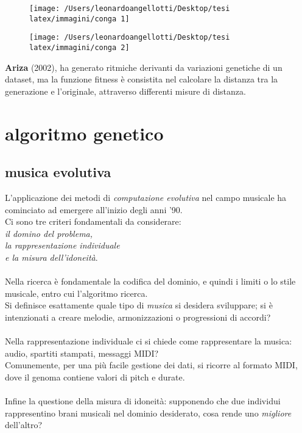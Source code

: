 \documentclass[a4paper,12pt]{report}
\begin{document}
\begin{figure}[H]
    \centering
    \begin{minipage}[b]{0.45\textwidth}
        \centering
        \texttt{[image: /Users/leonardoangellotti/Desktop/tesi latex/immagini/conga 1]}
        \label{fig:image1}
    \end{minipage}
    \hfill
    \begin{minipage}[b]{0.45\textwidth}
        \centering
        \texttt{[image: /Users/leonardoangellotti/Desktop/tesi latex/immagini/conga 2]}
        \label{fig:image2}
    \end{minipage}
\end{figure}

\textbf{Ariza} (2002), ha generato ritmiche derivanti da variazioni genetiche di un dataset, ma la funzione fitness è consistita nel calcolare la distanza tra la generazione e l'originale, attraverso differenti misure di distanza. 

\section{algoritmo genetico}

\subsection{musica evolutiva}

L'applicazione dei metodi di \textit{computazione evolutiva} nel campo musicale ha cominciato ad emergere all'inizio degli anni '90. \\
Ci sono tre criteri fondamentali da considerare: \\
\textit{il domino del problema,} \\
\textit{la rappresentazione individuale} \\
\textit{e la misura dell'idoneità}. \\
\\
Nella ricerca è fondamentale la codifica del dominio, e quindi i limiti o lo stile musicale, entro cui l'algoritmo ricerca. \\
Si definisce esattamente quale tipo di \textit{musica} si desidera sviluppare; si è intenzionati a creare melodie, armonizzazioni o progressioni di accordi? \\
\\
Nella rappresentazione individuale ci si chiede come rappresentare la musica: audio, spartiti stampati, messaggi MIDI? \\
Comunemente, per una più facile gestione dei dati, si ricorre al formato MIDI, dove il genoma contiene valori di pitch e durate. \\
\\
Infine la questione della misura di idoneità: supponendo che due individui rappresentino brani musicali nel dominio desiderato, cosa rende uno \textit{migliore} dell’altro? 
\end{document}
